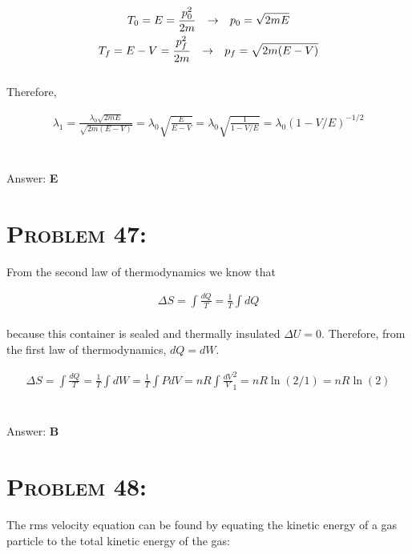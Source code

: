 \documentclass{article}
\begin{document}
\begin{gather}
T_{0} = E = \frac{p_{0}^{2}}{2m} \hspace{.1in} \rightarrow \hspace{.1in} p_{0} = \sqrt{2mE}\nonumber\\
T_{f} = E-V = \frac{p_{f}^{2}}{2m} \hspace{.1in} \rightarrow \hspace{.1in} p_{f} = \sqrt{2m(E-V)}\nonumber
\end{gather}
\\
Therefore,

\begin{gather}
\lambda_{1} = \frac{\lambda_{0} \sqrt{2mE}}{\sqrt{2m(E-V)}} = \lambda_{0}\sqrt{\frac{E}{E-V}} = \lambda_{0}\sqrt{\frac{1}{1-V/E}} = \boxed{\lambda_{0} \left(  1- V/E \right)^{-1/2}}\nonumber
\end{gather}
\\\\
Answer: \textbf{\textcolor{ProcessBlue}E}\\


\section{\textsc{Problem 47:}} From the second law of thermodynamics we know that

\begin{gather}
\Delta S = \int{\frac{dQ}{T}} = \frac{1}{T} \int{dQ}
\end{gather}
\\
because this container is sealed and thermally insulated $\Delta U = 0$. Therefore, from the first law of thermodynamics,   $d Q=dW$.

\begin{gather}
\Delta S = \int{\frac{dQ}{T}} = \frac{1}{T} \int{dW} = \frac{1}{T} \int{P dV} = nR \int{\frac{ dV}{V}}_{1}^{2} = nR\ln{(2/1)} = \boxed{n R \ln{(2)}}\nonumber
\end{gather}
\\\\
Answer: \textbf{\textcolor{ProcessBlue}B}\\


\section{\textsc{Problem 48:}} The rms velocity equation can be found by equating the kinetic energy of a gas particle to the total kinetic energy of the gas:
\end{document}
